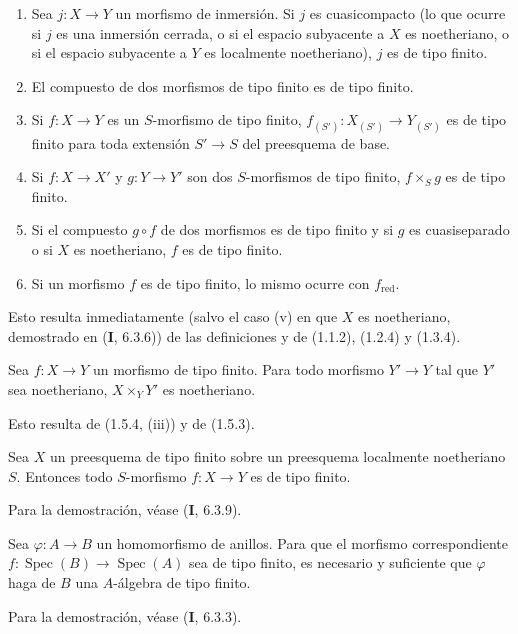 \begin{proposition}[1.5.4]
\label{IV.1.5.4-fr}
\begin{enumerate}
  \item[\textup{(i)}] Sea $j:X\to Y$ un morfismo de inmersión. Si $j$ es
  cuasicompacto (lo que ocurre si $j$ es una inmersión cerrada, o si
  el espacio subyacente a $X$ es noetheriano, o si el espacio subyacente a $Y$
  es localmente noetheriano), $j$ es de tipo finito.
  \item[\textup{(ii)}] El compuesto de dos morfismos de tipo finito es de tipo finito.
  \item[\textup{(iii)}] Si $f:X\to Y$ es un $S$-morfismo de tipo finito,
  $f_{(S')}:X_{(S')}\to Y_{(S')}$ es de tipo finito para toda extensión
  $S'\to S$ del preesquema de base.
  \item[\textup{(iv)}] Si $f:X\to X'$ y $g:Y\to Y'$ son dos $S$-morfismos de tipo
  finito, $f\times_Sg$ es de tipo finito.
  \item[\textup{(v)}] Si el compuesto $g\circ f$ de dos morfismos es de tipo finito y
  si $g$ es cuasiseparado o si $X$ es noetheriano, $f$ es de tipo finito.
  \item[\textup{(vi)}] Si un morfismo $f$ es de tipo finito, lo mismo ocurre con
  $f_{\mathrm{red}}$.
\end{enumerate}
\end{proposition}

Esto resulta inmediatamente (salvo el caso (v) en que $X$ es noetheriano, demostrado en
(\textbf{I}, 6.3.6)) de las definiciones y de (1.1.2), (1.2.4) y (1.3.4).

\begin{corollary}[1.5.5]
\label{IV.1.5.5-fr}
Sea $f:X\to Y$ un morfismo de tipo finito. Para todo morfismo $Y'\to Y$ tal
que $Y'$ sea noetheriano, $X\times_YY'$ es noetheriano.
\end{corollary}

Esto resulta de (1.5.4, (iii)) y de (1.5.3).

\begin{corollary}[1.5.6]
\label{IV.1.5.6-fr}
Sea $X$ un preesquema de tipo finito sobre un preesquema localmente noetheriano $S$.
Entonces todo $S$-morfismo $f:X\to Y$ es de tipo finito.
\end{corollary}

Para la demostración, véase (\textbf{I}, 6.3.9).

\begin{proposition}[1.5.7]
\label{IV.1.5.7-fr}
Sea $\varphi:A\to B$ un homomorfismo de anillos. Para que el morfismo
correspondiente $f:\operatorname{Spec}(B)\to\operatorname{Spec}(A)$ sea de tipo finito, es necesario y suficiente
que $\varphi$ haga de $B$ una $A$-álgebra de tipo finito.
\end{proposition}

Para la demostración, véase (\textbf{I}, 6.3.3).

